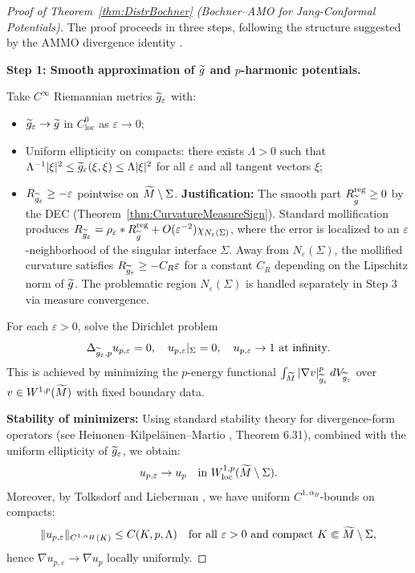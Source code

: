 \begin{proof}[Proof of Theorem~\ref{thm:DistrBochner} (Bochner--AMO for Jang-Conformal Potentials)]
The proof proceeds in three steps, following the structure suggested by the AMMO divergence identity \cite{amo2024}.

\textbf{Step 1: Smooth approximation of $\widetilde{g}$ and $p$-harmonic potentials.}

Take $C^\infty$ Riemannian metrics $\widetilde{g}_\varepsilon$ with:
\begin{itemize}
    \item $\widetilde{g}_\varepsilon \to \widetilde{g}$ in $C^0_{\mathrm{loc}}$ as $\varepsilon \to 0$;
    \item Uniform ellipticity on compacts: there exists $\Lambda > 0$ such that $\Lambda^{-1} |\xi|^2 \le \widetilde{g}_\varepsilon(\xi, \xi) \le \Lambda |\xi|^2$ for all $\varepsilon$ and all tangent vectors $\xi$;
    \item $R_{\widetilde{g}_\varepsilon} \ge -\varepsilon$ pointwise on $\widetilde{M} \setminus \Sigma$. \textbf{Justification:} The smooth part $R_{\widetilde{g}}^{\mathrm{reg}} \ge 0$ by the DEC (Theorem~\ref{thm:CurvatureMeasureSign}). Standard mollification produces $R_{\widetilde{g}_\varepsilon} = \rho_\varepsilon * R_{\widetilde{g}}^{\mathrm{reg}} + O(\varepsilon^{-2})\chi_{N_\varepsilon(\Sigma)}$, where the error is localized to an $\varepsilon$-neighborhood of the singular interface $\Sigma$. Away from $N_\varepsilon(\Sigma)$, the mollified curvature satisfies $R_{\widetilde{g}_\varepsilon} \ge -C_R\varepsilon$ for a constant $C_R$ depending on the Lipschitz norm of $\widetilde{g}$. The problematic region $N_\varepsilon(\Sigma)$ is handled separately in Step 3 via measure convergence.
\end{itemize}

For each $\varepsilon > 0$, solve the Dirichlet problem
\begin{equation}\label{eq:RegularizedDirichlet}
    \Delta_{\widetilde{g}_\varepsilon, p} u_{p,\varepsilon} = 0, \quad u_{p,\varepsilon}|_\Sigma = 0, \quad u_{p,\varepsilon} \to 1 \text{ at infinity}.
\end{equation}
This is achieved by minimizing the $p$-energy functional $\int_{\widetilde{M}} |\nabla v|_{\widetilde{g}_\varepsilon}^p \, dV_{\widetilde{g}_\varepsilon}$ over $v \in W^{1,p}(\widetilde{M})$ with fixed boundary data.

\textbf{Stability of minimizers:} Using standard stability theory for divergence-form operators (see Heinonen--Kilpel\"ainen--Martio \cite{hkm1993}, Theorem 6.31), combined with the uniform ellipticity of $\widetilde{g}_\varepsilon$, we obtain:
\begin{equation}\label{eq:W1pConvergence}
    u_{p,\varepsilon} \to u_p \quad \text{in } W^{1,p}_{\mathrm{loc}}(\widetilde{M} \setminus \Sigma).
\end{equation}
Moreover, by Tolksdorf \cite{tolksdorf1984} and Lieberman \cite{lieberman1988}, we have uniform $C^{1,\alpha_H}$-bounds on compacts:
\begin{equation}\label{eq:C1alphaUniform}
    \|u_{p,\varepsilon}\|_{C^{1,\alpha_H}(K)} \le C(K, p, \Lambda) \quad \text{for all } \varepsilon > 0 \text{ and compact } K \Subset \widetilde{M} \setminus \Sigma,
\end{equation}
hence $\nabla u_{p,\varepsilon} \to \nabla u_p$ locally uniformly.


\end{proof}
